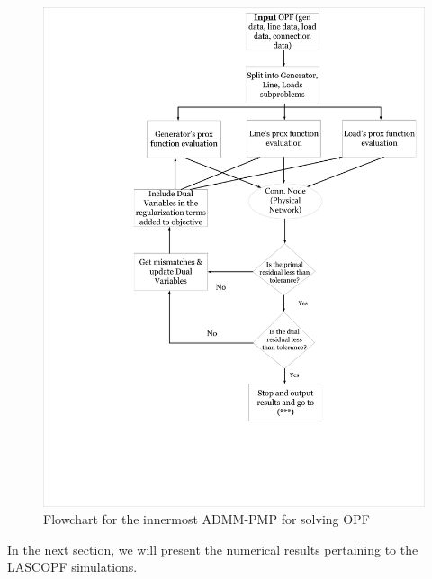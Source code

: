\documentclass[preprint,12pt,3p]{elsarticle}
\begin{document}
	\begin{figure}
		\begin{center}
			\vspace*{-2cm}
			\hspace*{-4cm}
			\includegraphics[width=0.92\linewidth,trim=5mm 12mm 5mm 5mm, clip]{OPFADMM_hp.pdf}
			\caption{Flowchart for the innermost ADMM-PMP for solving OPF}
			\label{OPFADMM}
		\end{center}
	\end{figure}
	In the next section, we will present the numerical results pertaining to the LASCOPF simulations.
	
\end{document}
